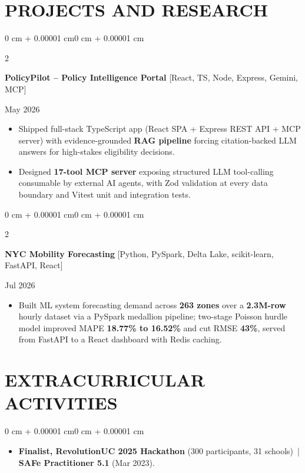 \documentclass[10pt, letterpaper]{article}
\newenvironment{highlights}{
    \begin{itemize}[
        topsep=0.10 cm,
        parsep=0.06 cm,
        partopsep=0pt,
        itemsep=0.06 cm,
        leftmargin=12pt
    ]
}{
    \end{itemize}
}
\newenvironment{onecolentry}{
    \begin{adjustwidth}{0 cm + 0.00001 cm}{0 cm + 0.00001 cm}
}{
    \end{adjustwidth}
}
\newenvironment{twocolentry}[2][]{
    \onecolentry
    \def\secondColumn{#2}
    \setcolumnwidth{\fill, 4.5 cm}
    \begin{paracol}{2}
}{
    \switchcolumn \raggedleft \secondColumn
    \end{paracol}
    \endonecolentry
}
\begin{document}
\section{PROJECTS AND RESEARCH}
\vspace{-0.05 cm}
\begin{twocolentry}{May 2026}
\textbf{PolicyPilot -- Policy Intelligence Portal} [React, TS, Node, Express, Gemini, MCP]
\end{twocolentry}
\begin{highlights}
  \item Shipped full-stack TypeScript app (React SPA + Express REST API + MCP server) with evidence-grounded \textbf{RAG pipeline} forcing citation-backed LLM answers for high-stakes eligibility decisions.
  \item Designed \textbf{17-tool MCP server} exposing structured LLM tool-calling consumable by external AI agents, with Zod validation at every data boundary and Vitest unit and integration tests.
\end{highlights}

\vspace{0.12 cm}

\begin{twocolentry}{Jul 2026}
\textbf{NYC Mobility Forecasting} [Python, PySpark, Delta Lake, scikit-learn, FastAPI, React]
\end{twocolentry}
\begin{highlights}
  \item Built ML system forecasting demand across \textbf{263 zones} over a \textbf{2.3M-row} hourly dataset via a PySpark medallion pipeline; two-stage Poisson hurdle model improved MAPE \textbf{18.77\% to 16.52\%} and cut RMSE \textbf{43\%}, served from FastAPI to a React dashboard with Redis caching.
\end{highlights}

\section{EXTRACURRICULAR ACTIVITIES}
\begin{onecolentry}
\begin{highlights}
  \item \textbf{Finalist, RevolutionUC 2025 Hackathon} (300 participants, 31 schools) \,|\, \textbf{SAFe Practitioner 5.1} (Mar 2023).
\end{highlights}
\end{onecolentry}
\end{document}
